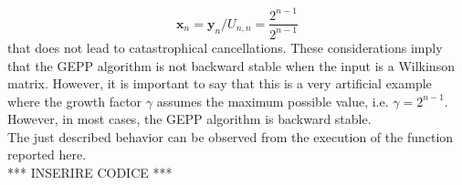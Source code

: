 \documentclass[a4paper]{report}
\numberwithin{equation}{chapter}
\begin{document}
\begin{equation}\label{key}
	\textbf{x}_{n} = \textbf{y}_{n}/U_{n,n} = \frac{2^{n-1}}{2^{n-1}}
\end{equation}
that does not lead to catastrophical cancellations. These considerations imply that the GEPP algorithm is not backward stable when the input is a Wilkinson matrix. However, it is important to say that this is a very artificial example where the growth factor $\gamma$ assumes the maximum possible value, i.e. $\gamma = 2^{n-1}$. However, in most cases, the GEPP algorithm is backward stable.\\
The just described behavior can be observed from the execution of the function reported here.\\

*** INSERIRE CODICE ***\\
\end{document}

